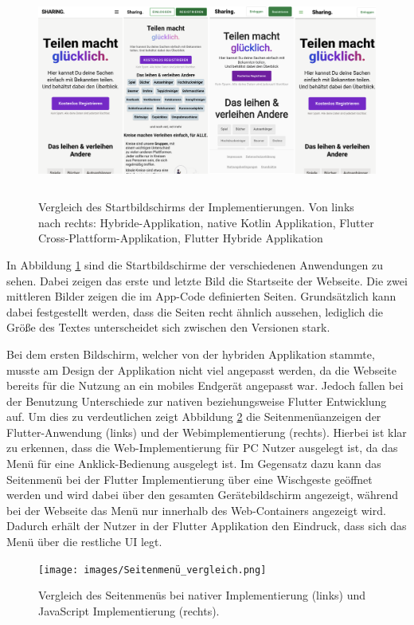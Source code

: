 \begin{figure}[ht]
  \centering
  \includegraphics[height=7cm,keepaspectratio]{images/Startbildschirm_vergleich.png} 
  \caption[Vergleich des Startbildschirms der Implementierungen]{Vergleich des Startbildschirms der Implementierungen. Von links nach rechts: Hybride-Applikation, native Kotlin Applikation, Flutter Cross-Plattform-Applikation, Flutter Hybride Applikation}
  \label{fig:startscreen}
\end{figure}

In Abbildung \ref{fig:startscreen} sind die Startbildschirme der verschiedenen Anwendungen zu sehen. Dabei zeigen das erste und letzte Bild die Startseite der Webseite. Die zwei mittleren Bilder zeigen die im App-Code definierten Seiten. Grundsätzlich kann dabei festgestellt werden, dass die Seiten recht ähnlich aussehen, lediglich die Größe des Textes unterscheidet sich zwischen den Versionen stark.

Bei dem ersten Bildschirm, welcher von der hybriden Applikation stammte, musste am Design der Applikation nicht viel angepasst werden, da die Webseite bereits für die Nutzung an ein mobiles Endgerät angepasst war. Jedoch fallen bei der Benutzung Unterschiede zur nativen beziehungsweise Flutter Entwicklung auf. 
Um dies zu verdeutlichen zeigt Abbildung \ref{fig:sidemenu} die Seitenmenüanzeigen der Flutter-Anwendung (links) und der Webimplementierung (rechts). Hierbei ist klar zu erkennen, dass die Web-Implementierung für PC Nutzer ausgelegt ist, da das Menü für eine Anklick-Bedienung ausgelegt ist. 
Im Gegensatz dazu kann das Seitenmenü bei der Flutter Implementierung über eine Wischgeste geöffnet werden und wird dabei über den gesamten Gerätebildschirm angezeigt, während bei der Webseite das Menü nur innerhalb des Web-Containers angezeigt wird. Dadurch erhält der Nutzer in der Flutter Applikation den Eindruck, dass sich das Menü über die restliche UI legt. 
\begin{figure}[ht]
  \centering
  \texttt{[image: images/Seitenmenü\_vergleich.png]} 
  \caption[Vergleich des Seitenmenüs der nativen und hybriden Applikation]{Vergleich des Seitenmenüs bei nativer Implementierung (links) und JavaScript Implementierung (rechts).}
  \label{fig:sidemenu}
\end{figure}

